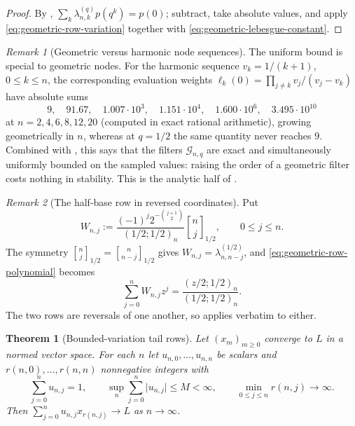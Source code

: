 \documentclass[11pt,oneside,openany]{book}
\newtheorem{theorem}{Theorem}[chapter]
\theoremstyle{definition}
\theoremstyle{remark}
\newtheorem{remark}[remark]{Remark}
\newcommand{\Qbinom}[3]{\genfrac{[}{]}{0pt}{}{#1}{#2}_{#3}}
\newcommand{\abs}[1]{\lvert #1\rvert}
\begin{document}
\begin{proof}
By , $\sum_k\lambda^{(q)}_{n,k}p(q^k)=p(0)$;
subtract, take absolute values, and apply \eqref{eq:geometric-row-variation} together
with \eqref{eq:geometric-lebesgue-constant}.
\end{proof}

\begin{remark}[Geometric versus harmonic node sequences]\label{rem:geometric-vs-harmonic-nodes}
The uniform bound is special to geometric nodes.  For the harmonic sequence
$v_k=1/(k+1)$, $0\le k\le n$, the corresponding evaluation weights
$\ell_k(0)=\prod_{j\ne k}v_j/(v_j-v_k)$ have absolute sums
\[
 9,\quad 91.67,\quad 1.007\cdot10^{3},\quad 1.151\cdot10^{4},
 \quad 1.600\cdot10^{6},\quad 3.495\cdot10^{10}
\]
at $n=2,4,6,8,12,20$ (computed in exact rational arithmetic), growing geometrically in
$n$, whereas at $q=1/2$ the same quantity never reaches $9$.  Combined with
, this says that the filters $\mathcal G_{n,q}$ are
exact and simultaneously uniformly bounded on the sampled values: raising the order of a
geometric filter costs nothing in stability.  This is the analytic half of
.
\end{remark}

\begin{remark}[The half-base row in reversed coordinates]\label{rem:halfbase-row-reversal}
Put
\[
 W_{n,j}:=\frac{(-1)^j2^{-\binom{j+1}{2}}}{(1/2;1/2)_n}\Qbinom nj{1/2},
 \qquad 0\le j\le n.
\]
The symmetry $\Qbinom nj{1/2}=\Qbinom n{n-j}{1/2}$ gives
$W_{n,j}=\lambda_{n,n-j}^{(1/2)}$, and \eqref{eq:geometric-row-polynomial} becomes
\[
 \sum_{j=0}^{n}W_{n,j}z^j=\frac{(z/2;1/2)_n}{(1/2;1/2)_n}.
\]
The two rows are reversals of one another, so  applies
verbatim to either.
\end{remark}

\begin{theorem}[Bounded-variation tail rows]\label{thm:tail-row-toeplitz}
Let $(x_m)_{m\ge0}$ converge to $L$ in a normed vector space.  For each $n$ let
$u_{n,0},\ldots,u_{n,n}$ be scalars and $r(n,0),\ldots,r(n,n)$ nonnegative integers with
\[
 \sum_{j=0}^{n}u_{n,j}=1,
 \qquad
 \sup_n\sum_{j=0}^{n}\abs{u_{n,j}}\le M<\infty,
 \qquad
 \min_{0\le j\le n}r(n,j)\longrightarrow\infty .
\]
Then $\sum_{j=0}^{n}u_{n,j}x_{r(n,j)}\to L$ as $n\to\infty$.
\end{theorem}
\end{document}
